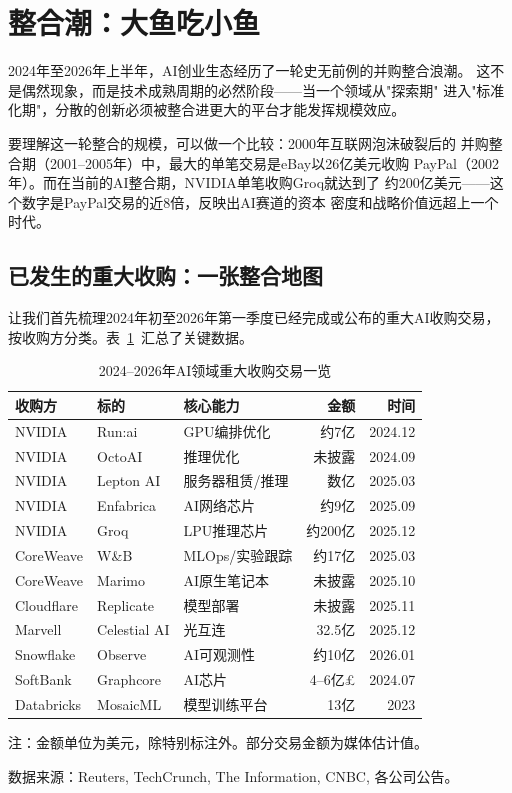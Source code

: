 \section{整合潮：大鱼吃小鱼}
\label{sec:outlook-consolidation}

2024年至2026年上半年，AI创业生态经历了一轮史无前例的并购整合浪潮。
这不是偶然现象，而是技术成熟周期的必然阶段——当一个领域从"探索期"
进入"标准化期"，分散的创新必须被整合进更大的平台才能发挥规模效应。

要理解这一轮整合的规模，可以做一个比较：2000年互联网泡沫破裂后的
并购整合期（2001--2005年）中，最大的单笔交易是eBay以26亿美元收购
PayPal（2002年）。而在当前的AI整合期，NVIDIA单笔收购Groq就达到了
约200亿美元——这个数字是PayPal交易的近8倍，反映出AI赛道的资本
密度和战略价值远超上一个时代。


\subsection{已发生的重大收购：一张整合地图}
\label{subsec:outlook-acquisitions-map}

让我们首先梳理2024年初至2026年第一季度已经完成或公布的重大AI收购交易，
按收购方分类。表~\ref{tab:major-acquisitions}~汇总了关键数据。

\begin{table}[htbp]
\centering
\caption{2024--2026年AI领域重大收购交易一览}
\label{tab:major-acquisitions}
\small
\begin{tabularx}{\textwidth}{llXrr}
\toprule
\rowcolor{figLightGray}
\textbf{收购方} & \textbf{标的} & \textbf{核心能力} &
  \textbf{金额} & \textbf{时间} \\
\midrule
NVIDIA & Run:ai & GPU编排优化 & 约7亿 & 2024.12 \\
NVIDIA & OctoAI & 推理优化 & 未披露 & 2024.09 \\
NVIDIA & Lepton AI & 服务器租赁/推理 & 数亿 & 2025.03 \\
NVIDIA & Enfabrica & AI网络芯片 & 约9亿 & 2025.09 \\
NVIDIA & Groq & LPU推理芯片 & 约200亿 & 2025.12 \\
CoreWeave & W\&B & MLOps/实验跟踪 & 约17亿 & 2025.03 \\
CoreWeave & Marimo & AI原生笔记本 & 未披露 & 2025.10 \\
Cloudflare & Replicate & 模型部署 & 未披露 & 2025.11 \\
Marvell & Celestial AI & 光互连 & 32.5亿 & 2025.12 \\
Snowflake & Observe & AI可观测性 & 约10亿 & 2026.01 \\
SoftBank & Graphcore & AI芯片 & 4--6亿£ & 2024.07 \\
Databricks & MosaicML & 模型训练平台 & 13亿 & 2023 \\
\bottomrule
\end{tabularx}

\medskip
\footnotesize
注：金额单位为美元，除特别标注外。部分交易金额为媒体估计值。

数据来源：Reuters, TechCrunch, The Information, CNBC, 各公司公告。
\end{table}


